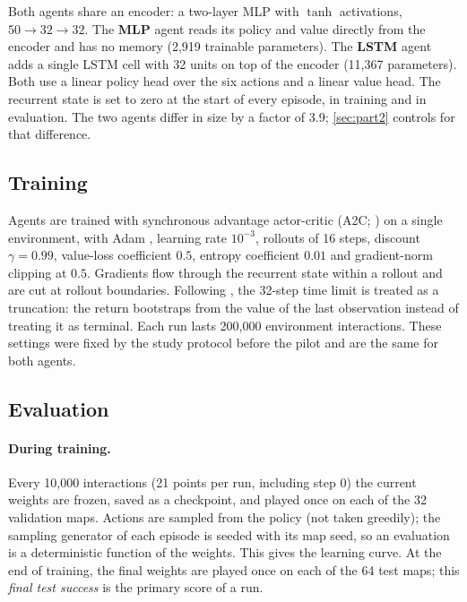 Both agents share an encoder: a two-layer MLP with $\tanh$ activations, $50\to32\to32$. The
\textbf{MLP} agent reads its policy and value directly from the encoder and has no memory
(2,919 trainable parameters). The \textbf{LSTM} agent adds a single LSTM cell
\citep{hochreiter1997lstm} with 32 units on top of the encoder (11,367 parameters). Both use a
linear policy head over the six actions and a linear value head. The recurrent state is set to
zero at the start of every episode, in training and in evaluation. The two agents differ in size
by a factor of 3.9; \cref{sec:part2} controls for that difference.

\subsection{Training}
\label{sec:training}

Agents are trained with synchronous advantage actor-critic (A2C; \citealp{mnih2016a3c}) on a
single environment, with Adam \citep{kingma2015adam}, learning rate $10^{-3}$, rollouts of 16
steps, discount $\gamma=0.99$, value-loss coefficient $0.5$, entropy coefficient $0.01$ and
gradient-norm clipping at $0.5$. Gradients flow through the recurrent state within a rollout and
are cut at rollout boundaries. Following \citet{pardo2018timelimits}, the 32-step time limit is
treated as a truncation: the return bootstraps from the value of the last observation instead of
treating it as terminal. Each run lasts 200,000 environment interactions. These settings were
fixed by the study protocol before the pilot and are the same for both agents.

\subsection{Evaluation}
\label{sec:eval}

\paragraph{During training.}
Every 10,000 interactions (21 points per run, including step 0) the current weights are frozen,
saved as a checkpoint, and played once on each of the 32 validation maps. Actions are sampled from
the policy (not taken greedily); the sampling generator of each episode is seeded with its map
seed, so an evaluation is a deterministic function of the weights. This gives the learning curve.
At the end of training, the final weights are played once on each of the 64 test maps; this
\emph{final test success} is the primary score of a run.

